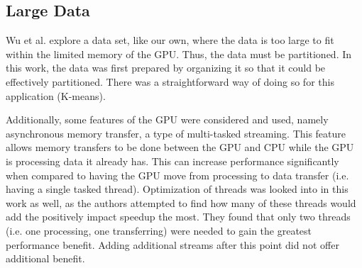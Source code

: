 \documentclass[smallextended]{svjour3}       %
\begin{document}
\subsection{Large Data}
\label{subsec:largedata}
Wu et al. \cite{wu2009clustering} explore a data set, like our own, where the
data is too large to fit within the limited memory of the GPU. Thus, the data
must be partitioned. In this work, the data was first prepared by organizing it
so that it could be effectively partitioned. There was a straightforward way of
doing so for this application (K-means).  

Additionally, some features of the GPU were considered and used, namely
asynchronous memory transfer, a type of multi-tasked streaming. This feature
allows memory transfers to be done between the GPU and CPU while the GPU is
processing data it already has. This can increase performance significantly
when compared to having the GPU move from processing to data transfer (i.e.
having a single tasked thread). Optimization of threads was looked into in this
work as well, as the authors attempted to find how many of these threads would
add the positively impact speedup the most. They found that only two threads
(i.e. one processing, one transferring) were needed to gain the greatest
performance benefit. Adding additional streams after this point did not offer
additional benefit.

\end{document}
